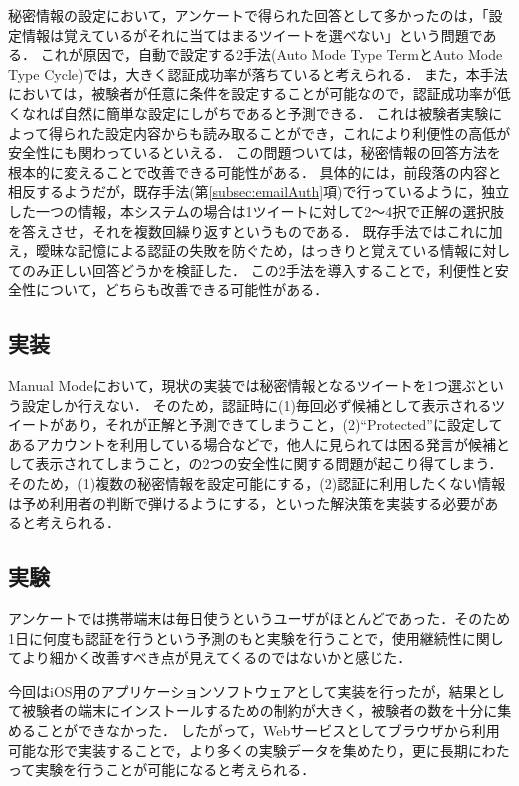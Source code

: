 秘密情報の設定において，アンケートで得られた回答として多かったのは，「設定情報は覚えているがそれに当てはまるツイートを選べない」という問題である．
これが原因で，自動で設定する2手法(Auto Mode Type TermとAuto Mode Type Cycle)では，大きく認証成功率が落ちていると考えられる．
また，本手法においては，被験者が任意に条件を設定することが可能なので，認証成功率が低くなれば自然に簡単な設定にしがちであると予測できる．
これは被験者実験によって得られた設定内容からも読み取ることができ，これにより利便性の高低が安全性にも関わっているといえる．
この問題ついては，秘密情報の回答方法を根本的に変えることで改善できる可能性がある．
具体的には，前段落の内容と相反するようだが，既存手法(第\ref{subsec:emailAuth}項)で行っているように，独立した一つの情報，本システムの場合は1ツイートに対して2〜4択で正解の選択肢を答えさせ，それを複数回繰り返すというものである．
既存手法ではこれに加え，曖昧な記憶による認証の失敗を防ぐため，はっきりと覚えている情報に対してのみ正しい回答どうかを検証した．
この2手法を導入することで，利便性と安全性について，どちらも改善できる可能性がある．

\subsection{実装}
Manual Modeにおいて，現状の実装では秘密情報となるツイートを1つ選ぶという設定しか行えない．
そのため，認証時に(1)毎回必ず候補として表示されるツイートがあり，それが正解と予測できてしまうこと，(2)``Protected''に設定してあるアカウントを利用している場合などで，他人に見られては困る発言が候補として表示されてしまうこと，の2つの安全性に関する問題が起こり得てしまう．
そのため，(1)複数の秘密情報を設定可能にする，(2)認証に利用したくない情報は予め利用者の判断で弾けるようにする，といった解決策を実装する必要があると考えられる．

\subsection{実験}
アンケートでは携帯端末は毎日使うというユーザがほとんどであった．そのため1日に何度も認証を行うという予測のもと実験を行うことで，使用継続性に関してより細かく改善すべき点が見えてくるのではないかと感じた．

今回はiOS用のアプリケーションソフトウェアとして実装を行ったが，結果として被験者の端末にインストールするための制約が大きく，被験者の数を十分に集めることができなかった．
したがって，Webサービスとしてブラウザから利用可能な形で実装することで，より多くの実験データを集めたり，更に長期にわたって実験を行うことが可能になると考えられる．

\newpage


